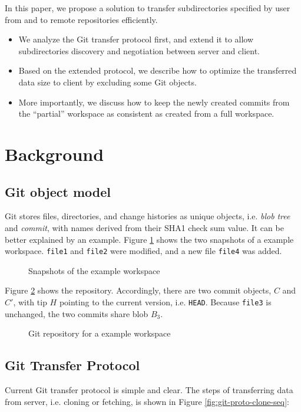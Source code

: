 \documentclass[preprint]{sigplanconf}
\begin{document}
In this paper, we propose a solution to transfer subdirectories specified by
user from and to remote repositories efficiently.

\begin{itemize}
  \item We analyze the Git transfer protocol first, and extend it to allow
      subdirectories discovery and negotiation between server and client.
  \item Based on the extended protocol, we describe how to optimize the
      transferred data size to client by excluding some Git objects.
  \item More importantly, we discuss how to keep the newly created commits from
      the ``partial'' workspace as consistent as created from a full workspace.
\end{itemize}

\section{Background}
\subsection{Git object model}
Git stores files, directories, and change histories as unique objects, i.e.
\emph{blob} \emph{tree} and \emph{commit}, with names derived from their SHA1
check sum value\cite{gitobj}.
It can be better explained by an example.
Figure \ref{fig:workspace} shows the two snapshots of a example workspace.
\verb|file1| and \verb|file2| were modified, and a new file \verb|file4| was
added.
\begin{figure}[htpb]
  \centering
  
  \caption{Snapshots of the example workspace}
  \label{fig:workspace}
\end{figure}

Figure \ref{fig:git-repo} shows the repository.
Accordingly, there are two commit objects, $C$ and $C'$, with tip $H$ pointing
to the current version, i.e. \verb|HEAD|.
Because \verb|file3| is unchanged, the two commits share blob $B_3$.

\begin{figure}[htpb]
  \centering
  
  \caption{Git repository for a example workspace}
  \label{fig:git-repo}
\end{figure}

\subsection{Git Transfer Protocol}
Current Git transfer protocol is simple and clear\cite{tran-protocol}.
The steps of transferring data from server, i.e. cloning or fetching, is shown in Figure \ref{fig:git-proto-clone-seq}:
\end{document}
